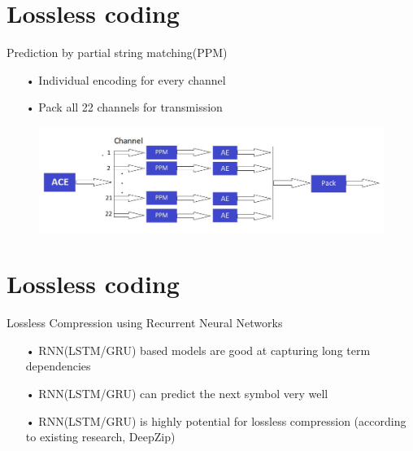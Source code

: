 \documentclass[notes=hide]{beamer}
\begin{document}
\newpage
\section{Lossless coding}
\begin{frame}


   \begin{block}{Prediction by partial string matching(PPM)}
   	\begin{itemize}
   		\item [•] Individual encoding for every channel 
   		\item [•] Pack all 22 channels for transmission		
   	\end{itemize}
   \end{block}
   \begin{figure}
   	\includegraphics[scale=0.48]{Vortrag/PPM.jpg}
   \end{figure}
\end{frame}



\newpage
\section{Lossless coding}
\begin{frame}


   \begin{block}{Lossless Compression using Recurrent Neural Networks}
   	\begin{itemize}
   		\item [•] RNN(LSTM/GRU) based models are good at capturing long term dependencies 
        \item [•] RNN(LSTM/GRU) can predict the next symbol very well
		\item [•] RNN(LSTM/GRU) is highly potential for lossless compression (according to existing research, DeepZip)
   	\end{itemize}
   \end{block}
\end{frame}

\newpage
\end{document}
